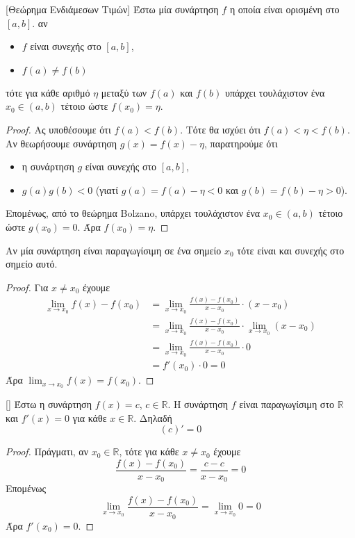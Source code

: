 \documentclass[a4paper, 12pt]{article}
\begin{document}
\begin{theorem}{}{[Θεώρημα Ενδιάμεσων Τιμών]}
  Έστω μία συνάρτηση $f$ η οποία είναι ορισμένη στο $[a,b]$. αν
  \begin{itemize}
    \item $f$ είναι συνεχής στο $[a,b]$,
    \item $f(a)\ne f(b)$
  \end{itemize}
  τότε για κάθε αριθμό $η$ μεταξύ των $f(a)$ και $f(b)$ υπάρχει τουλάχιστον ένα $x_0\in (a,b)$ τέτοιο ώστε $f(x_0)=η$.
\end{theorem}
\begin{proof}
  Ας υποθέσουμε ότι $f(a)<f(b)$. Τότε θα ισχύει ότι $f(a)<η<f(b)$. Αν θεωρήσουμε συνάρτηση $g(x)=f(x)-η$, παρατηρούμε ότι
  \begin{itemize}
    \item η συνάρτηση $g$ είναι συνεχής στο $[a,b]$,
    \item $g(a)g(b)<0$ (γιατί $g(a)=f(a)-η<0$ και $g(b)=f(b)-η>0$).
  \end{itemize}
  Επομένως, από το θεώρημα Bolzano, υπάρχει τουλάχιστον ένα $x_0\in (a,b)$ τέτοιο ώστε $g(x_0)=0$. Άρα $f(x_0)=η$.
\end{proof}

\begin{theorem}{}
  Αν μία συνάρτηση είναι παραγωγίσιμη σε ένα σημείο $x_0$ τότε είναι και συνεχής στο σημείο αυτό.
\end{theorem}
\begin{proof}
  Για $x\ne x_0$ έχουμε
  \begin{align*}
    \lim_{x\to x_0}f(x) -f(x_0) & =\lim_{x\to x_0}\frac{f(x) -f(x_0)}{x-x_0}\cdot(x-x_0)                \\
                                & =\lim_{x\to x_0}\frac{f(x) -f(x_0)}{x-x_0}\cdot\lim_{x\to x_0}(x-x_0) \\
                                & =\lim_{x\to x_0}\frac{f(x) -f(x_0)}{x-x_0}\cdot 0                     \\
                                & =f'(x_0) \cdot 0 = 0
  \end{align*}
  Άρα $\lim_{x\to x_0}f(x)=f(x_0)$.
\end{proof}

\begin{theorem}{}[]
  Έστω η συνάρτηση $f(x)=c$, $c\in\mathbb{R}$. Η συνάρτηση $f$ είναι παραγωγίσιμη στο $\mathbb{R}$ και $f'(x)=0$ για κάθε $x\in\mathbb{R}$. Δηλαδή
  $$(c)'=0$$
\end{theorem}
\begin{proof}
  Πράγματι, αν $x_0\in\mathbb{R}$, τότε για κάθε $x\ne x_0$ έχουμε
  $$ \frac{f(x)-f(x_0)}{x-x_0}=\frac{c-c}{x-x_0}=0$$
  Επομένως
  $$\lim_{x\to x_0}\frac{f(x)-f(x_0)}{x-x_0}=\lim_{x\to x_0}0=0$$
  Άρα $f'(x_0)=0$.
\end{proof}
\end{document}

